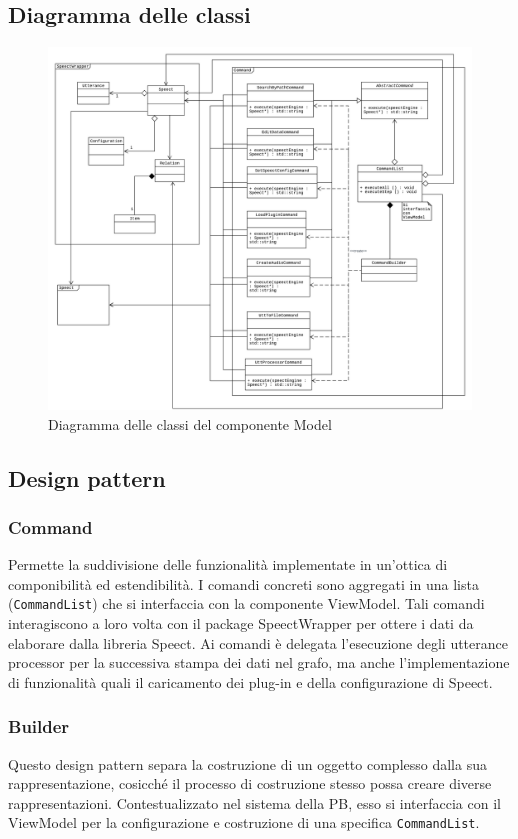 \documentclass[openany,12pt,a4paper]{report}
\begin{document}
	\subsection{Diagramma delle classi}
	
	\begin{figure}[H]
		\includegraphics[scale=0.45]{ModelDiagram}
		\centering
		\caption{Diagramma delle classi del componente Model}
	\end{figure}
		
	\subsection{Design pattern}
	
	\subsubsection{Command}
	Permette la suddivisione delle funzionalità implementate in un'ottica di componibilità ed estendibilità. I comandi concreti sono aggregati in una lista (\verb|CommandList|) che si interfaccia con la componente ViewModel. Tali comandi interagiscono a loro volta con il package SpeectWrapper per ottere i dati da elaborare dalla libreria Speect. Ai comandi è delegata l'esecuzione degli utterance processor per la successiva stampa dei dati nel grafo, ma anche l'implementazione di funzionalità quali il caricamento dei plug-in e della configurazione di Speect.
	
	\subsubsection{Builder}
	Questo design pattern separa la costruzione di un oggetto complesso dalla sua rappresentazione, cosicché il processo di costruzione stesso possa creare diverse rappresentazioni. Contestualizzato nel sistema della PB, esso si interfaccia con il ViewModel per la configurazione e costruzione di una specifica \verb|CommandList|.
	
\end{document}
